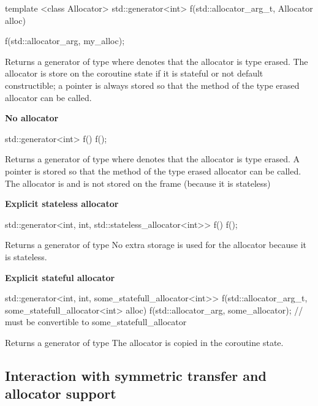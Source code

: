 \documentclass{wg21}
\begin{document}
\begin{colorblock}
template <class Allocator>
std::generator<int> f(std::allocator_arg_t, Allocator alloc) {}

f(std::allocator_arg, my_alloc{});
\end{colorblock}

Returns a generator of type  where  denotes that the allocator is type erased.
The allocator is store on the coroutine state if it is stateful or not default constructible; a pointer is always stored so that the  method of the type erased allocator can be called.


\textbf{No allocator}

\begin{colorblock}
std::generator<int> f() {}
f();
\end{colorblock}

Returns a generator of type  where  denotes that the allocator is type erased.
A pointer is stored so that the  method of the type erased allocator can be called. The allocator is  and is not stored on the frame (because it is stateless)

\textbf{Explicit stateless allocator}

\begin{colorblock}
std::generator<int, int, std::stateless_allocator<int>> f() {}
f();
\end{colorblock}

Returns a generator of type 
No extra storage is used for the allocator because it is stateless.

\textbf{Explicit stateful allocator}

\begin{colorblock}
std::generator<int, int, some_statefull_allocator<int>>
    f(std::allocator_arg_t,  some_statefull_allocator<int> alloc) {}
f(std::allocator_arg, some_allocator); // must be convertible to some_statefull_allocator
\end{colorblock}

Returns a generator of type 
The allocator is copied in the coroutine state.


\subsection{Interaction with symmetric transfer and allocator support}
\end{document}
